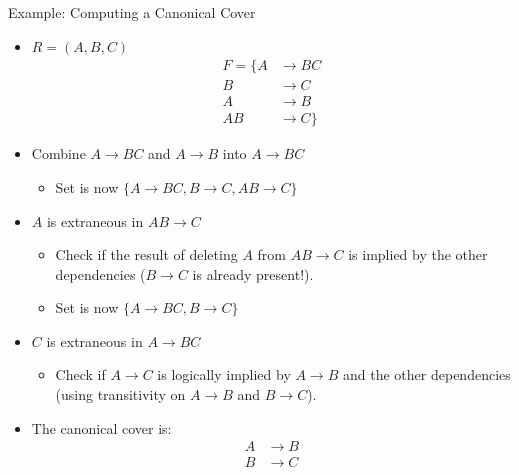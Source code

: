 \documentclass{beamer}
\begin{document}
\begin{frame}{Example: Computing a Canonical Cover}
    \footnotesize
    \begin{itemize}
        \item $R = (A, B, C)$
            \begin{equation*}
                \begin{align*}
                    F = \{ A &\rightarrow BC \\
                            B &\rightarrow C \\
                            A &\rightarrow B \\
                            AB &\rightarrow C \}
                \end{align*}
            \end{equation*}
        \item Combine $A \rightarrow BC$ and $A \rightarrow B$ into $A \rightarrow BC$
            \begin{itemize}
                \item Set is now $\{ A \rightarrow BC, B \rightarrow C, AB \rightarrow C \}$
            \end{itemize}
        \item $A$ is extraneous in $AB \rightarrow C$
            \begin{itemize}
                \item Check if the result of deleting $A$ from $AB \rightarrow C$ is implied by the other dependencies ($B \rightarrow C$ is already present!).
                \item Set is now $\{ A \rightarrow BC, B \rightarrow C \}$
            \end{itemize}
        \item $C$ is extraneous in $A \rightarrow BC$
            \begin{itemize}
                \item Check if $A \rightarrow C$ is logically implied by $A \rightarrow B$ and the other dependencies (using transitivity on $A \rightarrow B$ and $B \rightarrow C$).
            \end{itemize}
        \item The canonical cover is:
            \begin{equation*}
                \begin{align*}
                    A &\rightarrow B \\
                    B &\rightarrow C
                \end{align*}
            \end{equation*}
    \end{itemize}
\end{frame}
\end{document}
